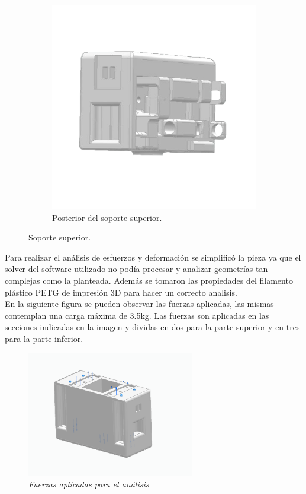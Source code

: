 \begin{figure}[H]
\begin{subfigure}[b]{0.45\textwidth}
        \includegraphics[width=\textwidth]{img/superior_atras.jpg}
        \caption{Posterior del soporte superior.}
        \label{fig:izaje_acoplado}
    \end{subfigure}
     \caption{Soporte superior.}
    \label{fig:Superior_orginal}
\end{figure}
Para realizar el análisis de esfuerzos y deformación se simplificó la pieza ya que el solver del software utilizado no podía procesar y analizar geometrías tan complejas como la planteada. Además se tomaron las propiedades del filamento plástico PETG de impresión 3D para hacer un correcto analisis.\\
En la siguiente figura se pueden observar las fuerzas aplicadas, las mismas contemplan una carga máxima de 3.5kg. Las fuerzas son aplicadas en las secciones indicadas en la imagen y dividas en dos para la parte superior y en tres para la parte inferior.\\
\begin{figure}[H]
    \centering
\includegraphics[width=0.65\textwidth]{img/Fuerzas_superiores.png} \par
    \caption{\textit{Fuerzas aplicadas para el análisis}}
    \label{fig:fuerzas_sup}
\end{figure}
